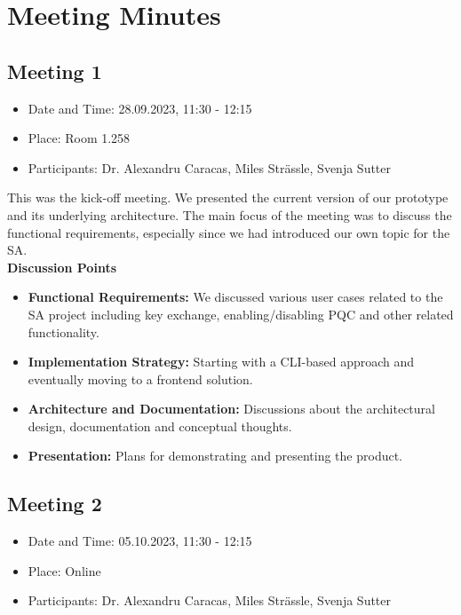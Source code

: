 \chapter{Meeting Minutes}
\section{Meeting 1}

\begin{itemize}
    \item Date and Time: 28.09.2023, 11:30 - 12:15
    \item Place: Room 1.258
    \item Participants: Dr. Alexandru Caracas, Miles Strässle, Svenja Sutter
\end{itemize}

\noindent This was the kick-off meeting. We presented the current version of our prototype and its underlying architecture. The main focus of the meeting was to discuss the functional requirements, especially since we had introduced our own topic for the SA.\\

\noindent\textbf{Discussion Points}
\begin{itemize}
    \item \textbf{Functional Requirements:} We discussed various user cases related to the SA project including key exchange, enabling/disabling PQC and other related functionality.
    \item \textbf{Implementation Strategy:} Starting with a CLI-based approach and eventually moving to a frontend solution.
    \item \textbf{Architecture and Documentation:} Discussions about the architectural design, documentation and conceptual thoughts.
    \item \textbf{Presentation:} Plans for demonstrating and presenting the product.
\end{itemize}

\section{Meeting 2}

\begin{itemize}
    \item Date and Time: 05.10.2023, 11:30 - 12:15
    \item Place: Online
    \item Participants: Dr. Alexandru Caracas, Miles Strässle, Svenja Sutter
\end{itemize}

